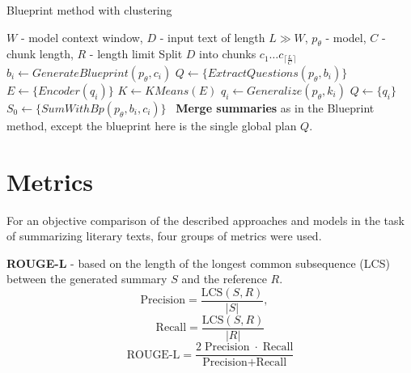 \documentclass{superfri}
\begin{document}
\begin{minipage}[t]{0.49\textwidth}
  \begin{algorithm}[H]
  \caption{Blueprint method with clustering}
      \begin{algorithmic}
        \Require $W$ - model context window, $D$ - input text of length $L \gg W$, $p_\theta$ - model, $C$ - chunk length, $R$ - length limit
        \State Split $D$ into chunks $c_1\dots c_{\lceil \frac{L}{C} \rceil}$
          \State $b_i \gets GenerateBlueprint(p_\theta, c_i)$
          \State $Q \gets \{ExtractQuestions(p_\theta, b_i)\}$
        \EndFor
          \State $E \gets \{Encoder(q_i)\}$
          \State $K \gets KMeans(E)$
            \State $q_i \gets Generalize(p_\theta, k_i)$
            \State $Q \gets \{q_i\}$ 
          \EndFor
            \State $S_0 \gets \{SumWithBp(p_\theta, b_i, c_i)\}$\
          \EndFor
        \EndFor
        \State \textbf{Merge summaries} as in the Blueprint method, except the blueprint here is the single global plan $Q$.
      \end{algorithmic}
  \end{algorithm}
\end{minipage}


\section{Metrics}

For an objective comparison of the described approaches and models in the task of summarizing literary texts, four groups of metrics were used.

\textbf{ROUGE-L} \cite{rouge} - based on the length of the longest common subsequence (LCS) between the generated summary $S$ and the reference $R$.
\begin{equation}
  \text{Precision} = \frac{\mathrm{LCS}(S,R)}{|S|},\quad
\end{equation}
\begin{equation}
  \text{Recall} = \frac{\mathrm{LCS}(S,R)}{|R|}
\end{equation}
\begin{equation}
  \text{ROUGE-L} = \frac{2\;\text{Precision}\;\cdot\;\text{Recall}}{\text{Precision} + \text{Recall}}
\end{equation}
\end{document}
